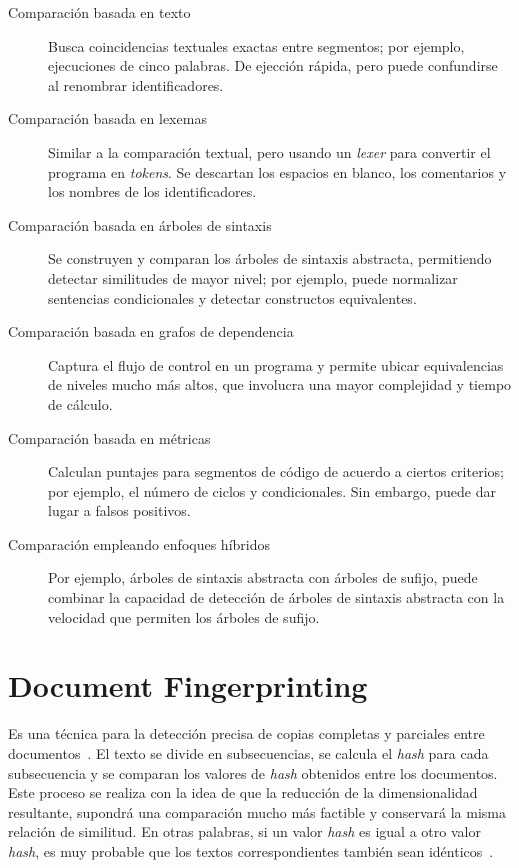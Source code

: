 \begin{description}
  \item [Comparación basada en texto] Busca coincidencias textuales exactas entre segmentos; por ejemplo, ejecuciones de cinco palabras. De ejección rápida, pero puede confundirse al renombrar identificadores.
  \item [Comparación basada en lexemas] Similar a la comparación textual, pero usando un \textit{lexer} para convertir el programa en \textit{tokens}. Se descartan los espacios en blanco, los comentarios y los nombres de los identificadores.
  \item [Comparación basada en árboles de sintaxis] Se construyen y comparan los árboles de sintaxis abstracta, permitiendo detectar similitudes de mayor nivel; por ejemplo, puede normalizar sentencias condicionales y detectar constructos equivalentes.
  \item [Comparación basada en grafos de dependencia] Captura el flujo de control en un programa y permite ubicar equivalencias de niveles mucho más altos, que involucra una mayor complejidad y tiempo de cálculo.
  \item [Comparación basada en métricas] Calculan puntajes para segmentos de código de acuerdo a ciertos criterios; por ejemplo, el número de ciclos y condicionales. Sin embargo, puede dar lugar a falsos positivos.
  \item [Comparación empleando enfoques híbridos] Por ejemplo, árboles de sintaxis abstracta con árboles de sufijo, puede combinar la capacidad de detección de árboles de sintaxis abstracta con la velocidad que permiten los árboles de sufijo.
\end{description}

\section{Document Fingerprinting}
\label{sec:doc}

Es una técnica para la detección precisa de copias completas 
y parciales entre documentos~\cite{Lindkvist2005WinnowingA}.
El texto se divide en subsecuencias, se calcula el \textit{hash} para cada 
subsecuencia y se comparan los valores de \textit{hash} obtenidos entre los documentos. 
Este proceso se realiza con la idea de que la reducción de la dimensionalidad resultante,
supondrá una comparación mucho más factible y conservará la misma relación de similitud.
En otras palabras, si un valor \textit{hash} es igual a otro valor \textit{hash}, 
es muy probable que los textos correspondientes también sean idénticos~\cite{Beth2014ACO}.

